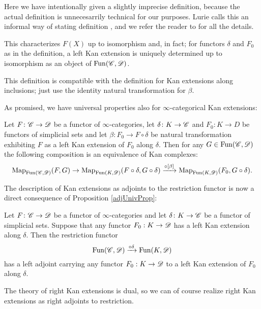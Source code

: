 \documentclass[../../thesis.tex]{subfiles}
\begin{document}
\begin{remark}
    Here we have intentionally given a slightly imprecise definition, because the actual definition is unnecesarrily technical for our purposes.
    Lurie calls this an informal way of stating definition \cite[\href{https://kerodon.net/tag/02YC}{Variant 02YC}]{kerodon}, and we refer the reader to \cite[\href{https://kerodon.net/tag/02Y7}{Subsection 02Y7}]{kerodon} for all the details.
\end{remark}
\begin{remark}
    This characterizes $F(X)$ up to isomorphism and, in fact; for functors $\delta$ and $F_0$ as in the definition, a left Kan extension is uniquely determined up to isomorphism as an object of $\mathrm{Fun}(\mathscr{C}, \mathscr{D})$.
\end{remark}
\begin{remark}
    This definition is compatible with the definition for Kan extensions along inclusions; just use the identity natural transformation for $\beta$.
\end{remark}
As promised, we have universal properties also for $\infty$-categorical Kan extensions:
\begin{proposition}
    Let $F \colon\mathscr{C} \to \mathscr{D}$ be a functor of $\infty$-categories, let $\delta \colon K\to \mathscr{C}$ and $F_0 \colon K \to D$ be functors of simplicial sets and let $\beta \colon F_0 \to F \circ \delta$ be natural transformation exhibiting $F$ as a left Kan extension of $F_0$ along $\delta$.
    Then for any $G \in \mathrm{Fun}(\mathscr{C}, \mathscr{D})$ the following composition is an equivalence of Kan complexes:
    \[
        \mathrm{Map}_{\mathrm{Fun}(\mathscr{C},\mathscr{D})}(F,G) \to \mathrm{Map}_{\mathrm{Fun}(K,\mathscr{D})}(F \circ \delta , G \circ \delta) \xrightarrow{\circ [\beta]} \mathrm{Map}_{\mathrm{Fun}(K,\mathscr{D})}(F_0, G\circ \delta).
    \]
\end{proposition}
The description of Kan extensions as adjoints to the restriction functor is now a direct consequence of Proposition \ref{adjUnivProp}:
\begin{corollary}
    Let $F \colon \mathscr{C} \to \mathscr{D}$ be a functor of $\infty$-categories and let $\delta \colon K\to \mathscr{C}$ be a functor of simplicial sets.
    Suppose that any functor $F_0 : K \to \mathscr{D}$ has a left Kan extension along $\delta$.
    Then the restriction functor
    \[
        \mathrm{Fun}(\mathscr{C}, \mathscr{D}) \xrightarrow{\circ \delta} \mathrm{Fun}(K, \mathscr{D})
    \]
    has a left adjoint carrying any functor $F_0 : K \to \mathscr{D}$ to a left Kan extension of $F_0$ along $\delta$.
\end{corollary}
The theory of right Kan extensions is dual, so we can of course realize right Kan extensions as right adjoints to restriction.
\end{document}
